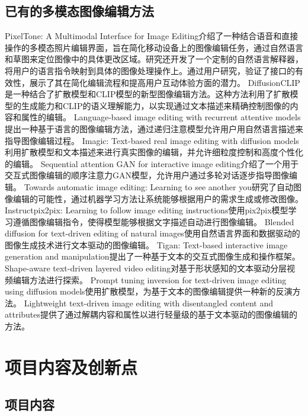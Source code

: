 \documentclass[a4paper,AutoFakeBold,oneside,12pt]{book}
\begin{document}
\subsection{已有的多模态图像编辑方法}
PixelTone: A Multimodal Interface for Image Editing\cite{laput2013pixeltone}介绍了一种结合语音和直接操作的多模态照片编辑界面，旨在简化移动设备上的图像编辑任务，通过自然语言和草图来定位图像中的具体更改区域。研究还开发了一个定制的自然语言解释器，将用户的语言指令映射到具体的图像处理操作上。通过用户研究，验证了接口的有效性，展示了其在简化编辑流程和提高用户互动体验方面的潜力。
DiffusionCLIP\cite{kim2022diffusionclip}是一种结合了扩散模型和CLIP\cite{radford2021learning}模型的新型图像编辑方法。这种方法利用了扩散模型的生成能力和CLIP的语义理解能力，以实现通过文本描述来精确控制图像的内容和属性的编辑。
Language-based image editing with recurrent attentive models\cite{chen2018language}提出一种基于语言的图像编辑方法，通过递归注意模型允许用户用自然语言描述来指导图像编辑过程。
Imagic: Text-based real image editing with diffusion models\cite{kawar2023imagic}利用扩散模型和文本描述来进行真实图像的编辑，并允许细粒度控制和高度个性化的编辑。
Sequential attention GAN for interactive image editing\cite{cheng2020sequential}介绍了一个用于交互式图像编辑的顺序注意力GAN模型，允许用户通过多轮对话逐步指导图像编辑。
Towards automatic image editing: Learning to see another you\cite{ghodrati2015towards}研究了自动图像编辑的可能性，通过机器学习方法让系统能够根据用户的需求生成或修改图像。
Instructpix2pix: Learning to follow image editing instructions\cite{brooks2023instructpix2pix}使用pix2pix模型学习遵循图像编辑指令，使得模型能够根据文字描述自动进行图像编辑。
Blended diffusion for text-driven editing of natural images\cite{avrahami2022blended}使用自然语言界面和数据驱动的图像生成技术进行文本驱动的图像编辑。
Tigan: Text-based interactive image generation and manipulation\cite{zhou2022tigan}提出了一种基于文本的交互式图像生成和操作框架。
Shape-aware text-driven layered video editing\cite{lee2023shape}对基于形状感知的文本驱动分层视频编辑方法进行探索。
Prompt tuning inversion for text-driven image editing using diffusion models\cite{dong2023prompt}使用扩散模型，为基于文本的图像编辑提供一种新的反演方法。
Lightweight text-driven image editing with disentangled content and attributes\cite{li2023lightweight}提供了通过解耦内容和属性以进行轻量级的基于文本驱动的图像编辑的方法。

\section{项目内容及创新点}
\subsection{项目内容}
\end{document}
